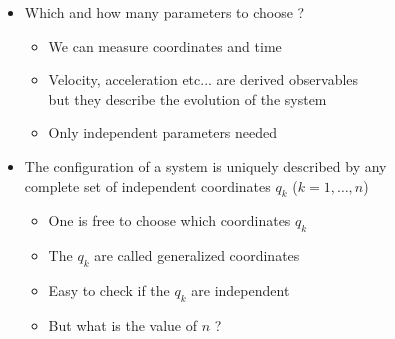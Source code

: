 \Tr
\begin{itemize}
\item Which and how many parameters to choose ?
\begin{itemize}
\item We can measure {\blue coordinates} and {\blue time}
\item Velocity, acceleration etc... are derived observables\\
      but they describe the evolution of the system
\item Only independent parameters needed
\end{itemize}
\end{itemize}
%
\begin{center}
{\red {}}
\end{center}
%
\begin{itemize}
\item The configuration of a system is uniquely described by any\\
      {\blue complete set} of {\blue independent coordinates} $q_{k}$ ($k=1,\ldots,n$)
\begin{itemize}
\item One is free to choose which coordinates $q_{k}$
\item[] The $q_{k}$ are called {\blue generalized coordinates}
\item Easy to check if the $q_{k}$ are independent
\item But what is the value of $n$ ?
\end{itemize}
\end{itemize}

